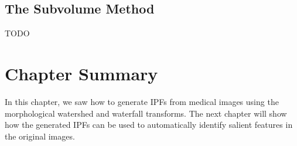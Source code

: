 \subsection{The Subvolume Method}
\label{subsec:segmentation-ipfconstruction-subvolume}

TODO

\section{Chapter Summary}

In this chapter, we saw how to generate IPFs from medical images using the morphological watershed and waterfall transforms. The next chapter will show how the generated IPFs can be used to automatically identify salient features in the original images.
